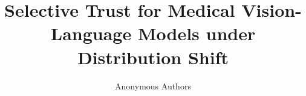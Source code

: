 \documentclass[11pt]{article}
\title{Selective Trust for Medical Vision-Language Models under Distribution Shift}
\author{Anonymous Authors}
\date{}
\begin{document}
\maketitle

\begin{abstract}

\end{abstract}











\end{document}
